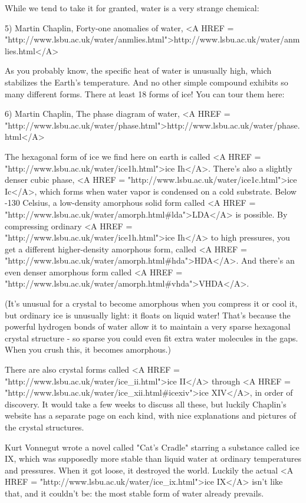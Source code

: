 While we tend to take it for granted, water is a very strange chemical:

5) Martin Chaplin, Forty-one anomalies of water, 
<A HREF = "http://www.lsbu.ac.uk/water/anmlies.html">http://www.lsbu.ac.uk/water/anmlies.html</A>

As you probably know, the specific heat of water is unusually high,
which stabilizes the Earth's temperature.  And no other simple compound
exhibits so many different forms.  There at least 18 forms of ice!  
You can tour them here:

6) Martin Chaplin, The phase diagram of water,
<A HREF = "http://www.lsbu.ac.uk/water/phase.html">http://www.lsbu.ac.uk/water/phase.html</A>

The hexagonal form of ice we find here on earth is called 
<A HREF = "http://www.lsbu.ac.uk/water/ice1h.html">ice Ih</A>.  
There's also a slightly denser cubic phase, 
<A HREF = "http://www.lsbu.ac.uk/water/ice1c.html">ice Ic</A>,
which forms when
water vapor is condensed on a cold substrate.   Below -130 Celsius, 
a low-density amorphous solid form called 
<A HREF = "http://www.lsbu.ac.uk/water/amorph.html#lda">LDA</A> 
is possible.  By 
compressing ordinary 
<A HREF = "http://www.lsbu.ac.uk/water/ice1h.html">ice Ih</A>
to high pressures, you get a different 
higher-density amorphous form, called 
<A HREF = "http://www.lsbu.ac.uk/water/amorph.html#hda">HDA</A>. 
And there's an even denser
amorphous form called
<A HREF = "http://www.lsbu.ac.uk/water/amorph.html#vhda">VHDA</A>. 

(It's unusual for a crystal to become amorphous when you compress it 
or cool it, but ordinary ice is unusually light: it floats on liquid
water!  That's because the powerful hydrogen bonds of water allow it 
to maintain a very sparse hexagonal crystal structure - so sparse you 
could even fit extra water molecules in the gaps.  When you crush this, 
it becomes amorphous.)

There are also crystal forms called 
<A HREF = "http://www.lsbu.ac.uk/water/ice_ii.html">ice II</A>
through 
<A HREF = "http://www.lsbu.ac.uk/water/ice_xii.html#icexiv">ice XIV</A>,
in order 
of discovery.  It would take a few weeks to discuss all these, but 
luckily Chaplin's website has a separate page on each kind, with nice
explanations and pictures of the crystal structures.

Kurt Vonnegut wrote a novel called "Cat's Cradle" starring a
substance called ice IX, which was supposedly more stable than liquid
water at ordinary temperatures and pressures.  When it got loose, it
destroyed the world.  Luckily the actual 
<A HREF = "http://www.lsbu.ac.uk/water/ice_ix.html">ice IX</A>
isn't like that, and it couldn't be: the most stable form of water 
already prevails.

